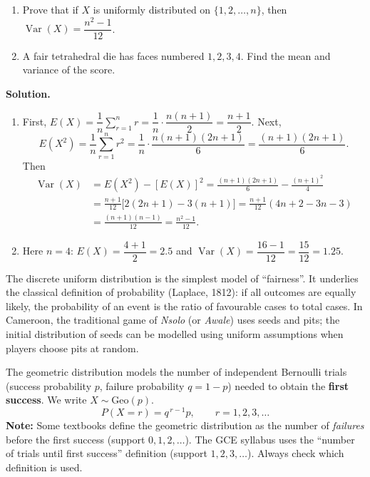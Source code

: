 \documentclass[11pt]{article}
\newcommand{\cle}[1]{{\popxbold\color{popdark}#1}}
\newcounter{popsec}
\newcounter{popsub}
\newcommand{\courssub}[1]{%
  \stepcounter{popsub}%
  \par\vspace{9pt}\noindent{\popxbold\fontsize{11.5}{13}\selectfont\color{popink}{\color{poporange}\thepopsec.\thepopsub}\hspace{6pt}#1}\par\nopagebreak\vspace{4pt}
}
\begin{document}
\begin{exoresolu}
\begin{enumerate}
\item Prove that if $X$ is uniformly distributed on $\{1, 2, \ldots, n\}$, then $\operatorname{Var}(X) = \dfrac{n^{2}-1}{12}$.
\item A fair tetrahedral die has faces numbered $1, 2, 3, 4$. Find the mean and variance of the score.
\end{enumerate}
\tcblower
\textbf{Solution.}
\begin{enumerate}
\item First, $E(X) = \dfrac{1}{n}\sum_{r=1}^{n} r = \dfrac{1}{n}\cdot\dfrac{n(n+1)}{2} = \dfrac{n+1}{2}$.
Next,
\[ E(X^{2}) = \frac{1}{n}\sum_{r=1}^{n} r^{2} = \frac{1}{n}\cdot\frac{n(n+1)(2n+1)}{6} = \frac{(n+1)(2n+1)}{6}. \]
Then
\begin{align*}
\operatorname{Var}(X) &= E(X^{2}) - [E(X)]^{2} = \frac{(n+1)(2n+1)}{6} - \frac{(n+1)^{2}}{4}\\
&= \frac{n+1}{12}\Big[2(2n+1) - 3(n+1)\Big] = \frac{n+1}{12}(4n + 2 - 3n - 3)\\
&= \frac{(n+1)(n-1)}{12} = \frac{n^{2} - 1}{12}.
\end{align*}
\item Here $n = 4$: $E(X) = \dfrac{4+1}{2} = 2.5$ and $\operatorname{Var}(X) = \dfrac{16 - 1}{12} = \dfrac{15}{12} = 1.25$.
\end{enumerate}
\end{exoresolu}

\begin{savaistu}
The discrete uniform distribution is the simplest model of ``fairness''. It underlies the classical definition of probability (Laplace, 1812): if all outcomes are equally likely, the probability of an event is the ratio of favourable cases to total cases. In Cameroon, the traditional game of \emph{Nsolo} (or \emph{Awale}) uses seeds and pits; the initial distribution of seeds can be modelled using uniform assumptions when players choose pits at random.
\end{savaistu}

\courssub{The Geometric Distribution}

\begin{definition}
The \cle{geometric distribution} models the number of independent Bernoulli trials (success probability $p$, failure probability $q=1-p$) needed to obtain the \textbf{first success}. We write $X \sim \mathrm{Geo}(p)$.
\[ P(X = r) = q^{\,r-1} p, \qquad r = 1, 2, 3, \ldots \]
\textbf{Note:} Some textbooks define the geometric distribution as the number of \emph{failures} before the first success (support $0,1,2,\ldots$). The GCE syllabus uses the ``number of trials until first success'' definition (support $1,2,3,\ldots$). Always check which definition is used.
\end{definition}
\end{document}
